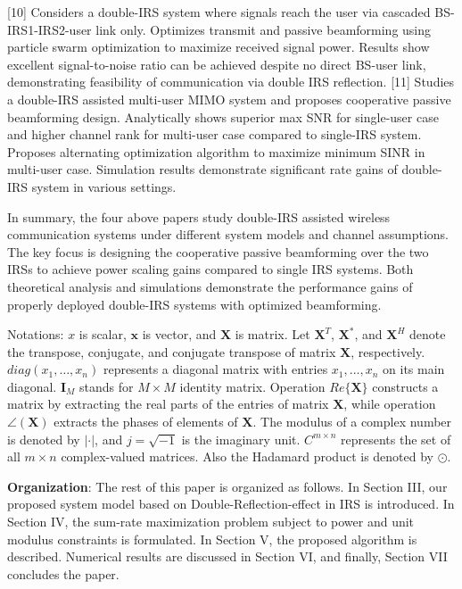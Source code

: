 \documentclass[11pt,twocolumn,twoside]{opticajnl}
\newcommand{\vect}[1]{\mathbf{#1}} %
\newcommand{\mat}[1]{\mathbf{#1}} %
\begin{document}
[10] Considers a double-IRS system where signals reach the user via cascaded BS-IRS1-IRS2-user link only.
Optimizes transmit and passive beamforming using particle swarm optimization to maximize received signal power.
Results show excellent signal-to-noise ratio can be achieved despite no direct BS-user link, demonstrating feasibility of communication via double IRS reflection.
[11] Studies a double-IRS assisted multi-user MIMO system and proposes cooperative passive beamforming design. Analytically shows superior max SNR for single-user case and higher channel rank for multi-user case compared to single-IRS system. Proposes alternating optimization algorithm to maximize minimum SINR in multi-user case. Simulation results demonstrate significant rate gains of double-IRS system in various settings.
\par In summary, the four above papers study double-IRS assisted wireless communication systems under different system models and channel assumptions. The key focus is designing the cooperative passive beamforming over the two IRSs to achieve power scaling gains compared to single IRS systems. Both theoretical analysis and simulations demonstrate the performance gains of properly deployed double-IRS systems with optimized beamforming.

\par Notations: $x$ is scalar, $\vect{x}$ is vector, and $\mat{X}$ is matrix. Let $\mat{X}^T$, $\mat{X}^*$, and $\mat{X}^H$ denote the transpose, conjugate, and conjugate transpose of matrix $\mat{X}$, respectively. ${diag} (x_1, \ldots, x_n)$ represents a diagonal matrix with entries $x_1, \ldots, x_n$ on its main diagonal. $\mat{I}_M$ stands for $M \times M$ identity matrix. Operation ${Re}\{\mat{X}\}$ constructs a matrix by extracting the real parts of the entries of matrix $\mat{X}$, while operation $\angle(\mat{X})$ extracts the phases of elements of $\mat{X}$. The modulus of a complex number is denoted by $|\cdot|$, and $j = \sqrt{-1}$ is the imaginary unit. ${C}^{m \times n}$ represents the set of all $m \times n$ complex-valued matrices. Also the Hadamard product is denoted by $\odot$.
\par {\bf Organization}: The rest of this paper is organized as follows. 
In Section III, our proposed system model based on Double-Reflection-effect in IRS is introduced.
In Section IV, the sum-rate maximization problem subject to
power and unit modulus constraints is formulated.
In Section V, the proposed algorithm is described.
Numerical results are discussed in Section VI, and finally,
Section VII concludes the paper.
\end{document}
